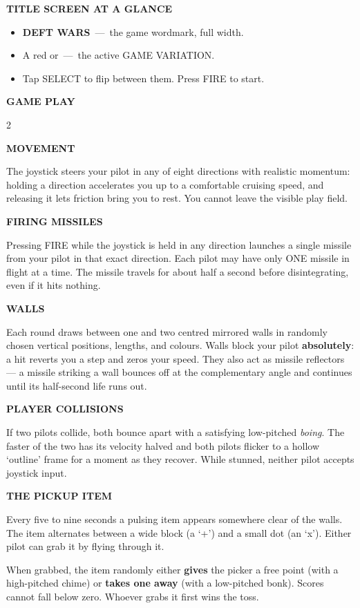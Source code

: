 \documentclass[10pt]{article}
\newcommand{\sectionrule}[1]{%
  \par\vspace{6pt}%
  \noindent\colorbox{atariOrange}{\parbox{\dimexpr\linewidth-2\fboxsep\relax}{\strut\textcolor{atariCream}{\textbf{\textsf{\MakeUppercase{#1}}}}\hfill}}%
  \par\vspace{4pt}%
}
\newcommand{\subhead}[1]{%
  \par\vspace{4pt}%
  \noindent\textbf{\textsf{\MakeUppercase{#1}}}\par\vspace{2pt}%
}
\begin{document}
\subhead{Title Screen at a Glance}
\begin{itemize}\itemsep0pt
\item {\sffamily\bfseries DEFT WARS} \,---\, the game wordmark, full width.
\item A red {} or {} \,---\, the active GAME VARIATION.
\item Tap SELECT to flip between them. Press FIRE to start.
\end{itemize}

\newpage

\sectionrule{Game Play}

\begin{multicols}{2}
\subhead{Movement}
The joystick steers your pilot in any of eight directions with realistic
momentum: holding a direction accelerates you up to a comfortable cruising
speed, and releasing it lets friction bring you to rest. You cannot
leave the visible play field.

\subhead{Firing Missiles}
Pressing FIRE while the joystick is held in any direction launches a
single missile from your pilot in that exact direction. Each pilot may
have only ONE missile in flight at a time. The missile travels for about
half a second before disintegrating, even if it hits nothing.

\subhead{Walls}
Each round draws between one and two centred mirrored walls in randomly
chosen vertical positions, lengths, and colours. Walls block your pilot
\textbf{absolutely}: a hit reverts you a step and zeros your speed. They
also act as missile reflectors --- a missile striking a wall bounces off
at the complementary angle and continues until its half-second life
runs out.

\subhead{Player Collisions}
If two pilots collide, both bounce apart with a satisfying low-pitched
\textit{boing}. The faster of the two has its velocity halved and both
pilots flicker to a hollow `outline' frame for a moment as they recover.
While stunned, neither pilot accepts joystick input.

\subhead{The Pickup Item}
Every five to nine seconds a pulsing item appears somewhere clear of the
walls. The item alternates between a wide block (a `+') and a small
dot (an `x'). Either pilot can grab it by flying through it.

When grabbed, the item randomly either {\bfseries gives} the picker a
free point (with a high-pitched chime) or {\bfseries takes one away}
(with a low-pitched bonk). Scores cannot fall below zero. Whoever grabs
it first wins the toss.


\end{multicols}
\end{document}
